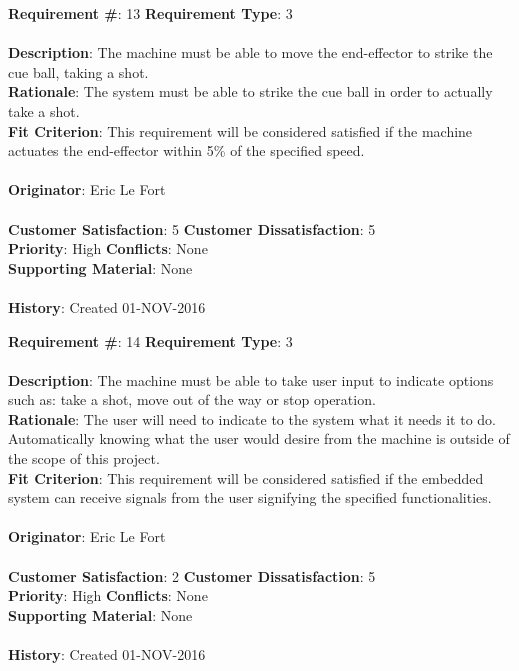 \documentclass[titlepage]{article}
\begin{document}
\begin{framed}
	\noindent\textbf{Requirement \#}: 13 \hfill \textbf{Requirement Type}: 3 \hfill\\\\
	\noindent\textbf{Description}: The machine must be able to move the end-effector to strike the cue ball, taking a shot.\\
	\textbf{Rationale}: The system must be able to strike the cue ball in order to actually take a shot.\\
	\textbf{Fit Criterion}: This requirement will be considered satisfied if the machine actuates the end-effector within 5\% of the specified speed.\\\\
	\textbf{Originator}: Eric Le Fort\\\\
	\noindent\textbf{Customer Satisfaction}: 5 \hfill 	\textbf{Customer Dissatisfaction}: 5 \hfill\\
	\textbf{Priority}: High \hfill \textbf{Conflicts}: None \hfill\\
	\textbf{Supporting Material}: None\\\\
	\noindent\textbf{History}: Created 01-NOV-2016
\end{framed}

\begin{framed}
	\noindent\textbf{Requirement \#}: 14 \hfill \textbf{Requirement Type}: 3 \hfill\\\\
	\noindent\textbf{Description}: The machine must be able to take user input to indicate options such as: take a shot, move out of the way or stop operation.\\
	\textbf{Rationale}: The user will need to indicate to the system what it needs it to do. Automatically knowing what the user would desire from the machine is outside of the scope of this project.\\
	\textbf{Fit Criterion}: This requirement will be considered satisfied if the embedded system can receive signals from the user signifying the specified functionalities.\\\\
	\textbf{Originator}: Eric Le Fort\\\\
	\noindent\textbf{Customer Satisfaction}: 2 \hfill 	\textbf{Customer Dissatisfaction}: 5 \hfill\\
	\textbf{Priority}: High \hfill \textbf{Conflicts}: None \hfill\\
	\textbf{Supporting Material}: None\\\\
	\noindent\textbf{History}: Created 01-NOV-2016
\end{framed}
\end{document}
